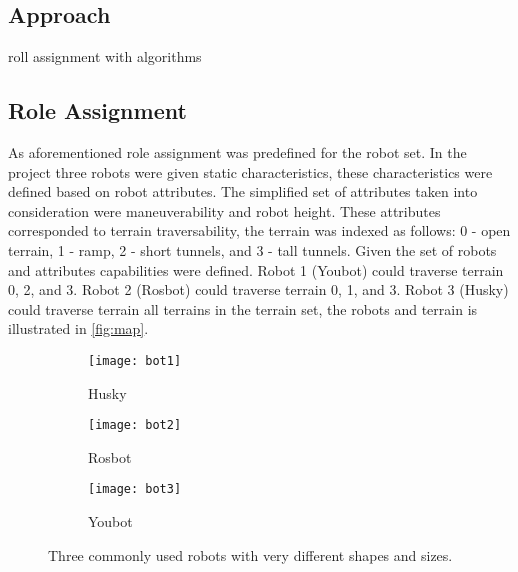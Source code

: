 \subsection{Approach}
roll assignment with algorithms


\subsection{Role Assignment}
As aforementioned role assignment was predefined for the robot set. In the project three robots were given static characteristics, these characteristics were defined based on robot attributes. The simplified set of attributes taken into consideration were maneuverability and robot height. These attributes corresponded to terrain traversability, the terrain was indexed as follows: 0 - open terrain, 1 - ramp, 2 - short tunnels, and 3 - tall tunnels. Given the set of robots and attributes capabilities were defined. Robot 1 (Youbot) could traverse terrain 0, 2, and 3. Robot 2 (Rosbot) could traverse terrain 0, 1, and 3. Robot 3 (Husky) could traverse terrain all terrains in the terrain set, the robots and terrain is illustrated in \ref{fig:map}.


\begin{figure}
    \centering
    \begin{subfigure}[b]{0.15\textwidth}
        \texttt{[image: bot1]}
        \caption{Husky}
        \label{fig:bot1}
    \end{subfigure}
    \begin{subfigure}[b]{0.15\textwidth}
        \texttt{[image: bot2]}
        \caption{Rosbot}
        \label{fig:bot2}
    \end{subfigure}
    \begin{subfigure}[b]{0.15\textwidth}
        \texttt{[image: bot3]}
        \caption{Youbot}
        \label{fig:bot3}
    \end{subfigure}
    \caption{Three commonly used robots with very different shapes and sizes.}\label{fig:bots}
\end{figure}

